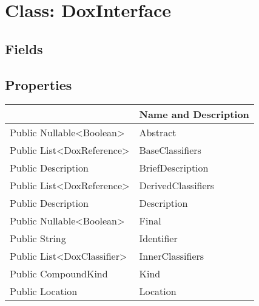 \documentclass[11pt, oneside, a4paper]{book}
\begin{document}
\hypertarget{SoftwareEngineeringTools.{}Documentation.{}DoxInterface}{}
\section{Class: DoxInterface}

\subsection{Fields}

\subsection{Properties}
\begin{center}
\begin{tabular}{| p{3cm} | p{12cm} | }
\hline
\textbf{ } & \textbf{ Name and Description}\\
\hline
 Public  Nullable<Boolean> &  Abstract\hypertarget{SoftwareEngineeringTools.{}Documentation.{}DoxInterface.{}Abstract}{}\\
\hline
 Public  List<DoxReference> &  BaseClassifiers\hypertarget{SoftwareEngineeringTools.{}Documentation.{}DoxInterface.{}BaseClassifiers}{}\\
\hline
 Public  Description &  BriefDescription\hypertarget{SoftwareEngineeringTools.{}Documentation.{}DoxInterface.{}BriefDescription}{}\\
\hline
 Public  List<DoxReference> &  DerivedClassifiers\hypertarget{SoftwareEngineeringTools.{}Documentation.{}DoxInterface.{}DerivedClassifiers}{}\\
\hline
 Public  Description &  Description\hypertarget{SoftwareEngineeringTools.{}Documentation.{}DoxInterface.{}Description}{}\\
\hline
 Public  Nullable<Boolean> &  Final\hypertarget{SoftwareEngineeringTools.{}Documentation.{}DoxInterface.{}Final}{}\\
\hline
 Public  String &  Identifier\hypertarget{SoftwareEngineeringTools.{}Documentation.{}DoxInterface.{}Identifier}{}\\
\hline
 Public  List<DoxClassifier> &  InnerClassifiers\hypertarget{SoftwareEngineeringTools.{}Documentation.{}DoxInterface.{}InnerClassifiers}{}\\
\hline
 Public  CompoundKind &  Kind\hypertarget{SoftwareEngineeringTools.{}Documentation.{}DoxInterface.{}Kind}{}\\
\hline
 Public  Location &  Location\hypertarget{SoftwareEngineeringTools.{}Documentation.{}DoxInterface.{}Location}{}\\

\end{tabular}
\end{center}
\end{document}
